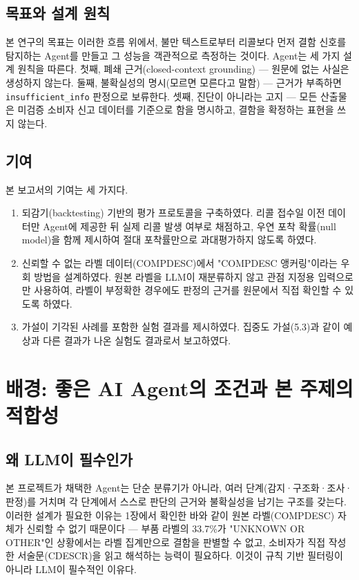 \documentclass[11pt]{article}
\begin{document}
\subsection{목표와 설계 원칙}

본 연구의 목표는 이러한 흐름 위에서, 불만 텍스트로부터 리콜보다 먼저 결함 신호를 탐지하는 Agent를 만들고 그 성능을 객관적으로 측정하는 것이다. Agent는 세 가지 설계 원칙을 따른다. 첫째, 폐쇄 근거(closed-context grounding) — 원문에 없는 사실은 생성하지 않는다. 둘째, 불확실성의 명시(모르면 모른다고 말함) — 근거가 부족하면 \texttt{insufficient\_info} 판정으로 보류한다. 셋째, 진단이 아니라는 고지 — 모든 산출물은 미검증 소비자 신고 데이터를 기준으로 함을 명시하고, 결함을 확정하는 표현을 쓰지 않는다.

\subsection{기여}

본 보고서의 기여는 세 가지다.

\begin{enumerate}
\item 되감기(backtesting) 기반의 평가 프로토콜을 구축하였다. 리콜 접수일 이전 데이터만 Agent에 제공한 뒤 실제 리콜 발생 여부로 채점하고, 우연 포착 확률(null model)을 함께 제시하여 절대 포착률만으로 과대평가하지 않도록 하였다.
\item 신뢰할 수 없는 라벨 데이터(COMPDESC)에서 "COMPDESC 앵커링"이라는 우회 방법을 설계하였다. 원본 라벨을 LLM이 재분류하지 않고 관점 지정용 입력으로만 사용하여, 라벨이 부정확한 경우에도 판정의 근거를 원문에서 직접 확인할 수 있도록 하였다.
\item 가설이 기각된 사례를 포함한 실험 결과를 제시하였다. 집중도 가설(5.3)과 같이 예상과 다른 결과가 나온 실험도 결과로서 보고하였다.
\end{enumerate}

\section{배경: 좋은 AI Agent의 조건과 본 주제의 적합성}

\subsection{왜 LLM이 필수인가}

본 프로젝트가 채택한 Agent는 단순 분류기가 아니라, 여러 단계(감지·구조화·조사·판정)를 거치며 각 단계에서 스스로 판단의 근거와 불확실성을 남기는 구조를 갖는다. 이러한 설계가 필요한 이유는 1장에서 확인한 바와 같이 원본 라벨(COMPDESC) 자체가 신뢰할 수 없기 때문이다 — 부품 라벨의 33.7\%가 "UNKNOWN OR OTHER"인 상황에서는 라벨 집계만으로 결함을 판별할 수 없고, 소비자가 직접 작성한 서술문(CDESCR)을 읽고 해석하는 능력이 필요하다. 이것이 규칙 기반 필터링이 아니라 LLM이 필수적인 이유다.
\end{document}

